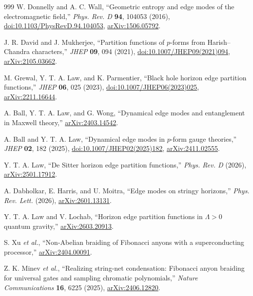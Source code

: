 \documentclass[aps,prd,reprint,nofootinbib,superscriptaddress,floatfix]{revtex4-2}
\numberwithin{equation}{section}
\theoremstyle{definition}
\theoremstyle{plain}
\begin{document}
\begin{thebibliography}{999}
W. Donnelly and A. C. Wall,
``Geometric entropy and edge modes of the electromagnetic field,''
\emph{Phys. Rev. D} \textbf{94}, 104053 (2016),
\href{https://doi.org/10.1103/PhysRevD.94.104053}{doi:10.1103/PhysRevD.94.104053},
\href{https://arxiv.org/abs/1506.05792}{arXiv:1506.05792}.

J. R. David and J. Mukherjee,
``Partition functions of \(p\)-forms from Harish--Chandra characters,''
\emph{JHEP} \textbf{09}, 094 (2021),
\href{https://doi.org/10.1007/JHEP09(2021)094}{doi:10.1007/JHEP09(2021)094},
\href{https://arxiv.org/abs/2105.03662}{arXiv:2105.03662}.

M. Grewal, Y. T. A. Law, and K. Parmentier,
``Black hole horizon edge partition functions,''
\emph{JHEP} \textbf{06}, 025 (2023),
\href{https://doi.org/10.1007/JHEP06(2023)025}{doi:10.1007/JHEP06(2023)025},
\href{https://arxiv.org/abs/2211.16644}{arXiv:2211.16644}.

A. Ball, Y. T. A. Law, and G. Wong,
``Dynamical edge modes and entanglement in Maxwell theory,''
\href{https://arxiv.org/abs/2403.14542}{arXiv:2403.14542}.

A. Ball and Y. T. A. Law,
``Dynamical edge modes in \(p\)-form gauge theories,''
\emph{JHEP} \textbf{02}, 182 (2025),
\href{https://doi.org/10.1007/JHEP02(2025)182}{doi:10.1007/JHEP02(2025)182},
\href{https://arxiv.org/abs/2411.02555}{arXiv:2411.02555}.

Y. T. A. Law,
``De Sitter horizon edge partition functions,''
\emph{Phys. Rev. D} (2026),
\href{https://arxiv.org/abs/2501.17912}{arXiv:2501.17912}.

A. Dabholkar, E. Harris, and U. Moitra,
``Edge modes on stringy horizons,''
\emph{Phys. Rev. Lett.} (2026),
\href{https://arxiv.org/abs/2601.13131}{arXiv:2601.13131}.

Y. T. A. Law and V. Lochab,
``Horizon edge partition functions in \(\Lambda>0\) quantum gravity,''
\href{https://arxiv.org/abs/2603.20913}{arXiv:2603.20913}.


S. Xu \emph{et al.},
``Non-Abelian braiding of Fibonacci anyons with a superconducting processor,''
\href{https://arxiv.org/abs/2404.00091}{arXiv:2404.00091}.

Z. K. Minev \emph{et al.},
``Realizing string-net condensation: Fibonacci anyon braiding for universal
gates and sampling chromatic polynomials,''
\emph{Nature Communications} \textbf{16}, 6225 (2025),
\href{https://arxiv.org/abs/2406.12820}{arXiv:2406.12820}.


\end{thebibliography}
\end{document}
